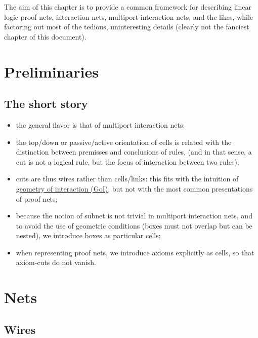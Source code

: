 
The aim of this chapter is to provide a common framework for describing
linear logic proof nets, interaction nets, multiport interaction nets,
and the likes, while factoring out most of the tedious, uninteresting
details (clearly not the fanciest chapter of this document).

\section{Preliminaries}\label{preliminaries}

\subsection{The short story}\label{the-short-story}

\begin{itemize}
\item
  the general flavor is that of multiport interaction nets;
\item
  the top/down or passive/active orientation of cells is related with
  the distinction between premisses and conclusions of rules, (and in
  that sense, a cut is not a logical rule, but the focus of interaction
  between two rules);
\item
  cuts are thus wires rather than cells/links: this fits with the
  intuition of \hyperref[geometry-of-interaction]{geometry of interaction (GoI)},
  but not with the most common presentations of proof nets;
\item
  because the notion of subnet is not trivial in multiport interaction
  nets, and to avoid the use of geometric conditions (boxes must not
  overlap but can be nested), we introduce boxes as particular cells;
\item
  when representing proof nets, we introduce axioms explicitly as cells,
  so that axiom-cuts do not vanish.
\end{itemize}

\section{Nets}\label{nets}

\subsection{Wires}\label{wires}

